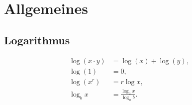\chapter{Allgemeines}
\section{Logarithmus}
\begin{align*}
	\log(x\cdot y)&=\log(x)+\log(y),\\
	\log(1)&=0,\\
	\log\!\left(x^r  \right)&=r\log x,\\
	\log_b x&=\frac{\log_a x}{\log_a b}.
\end{align*}
